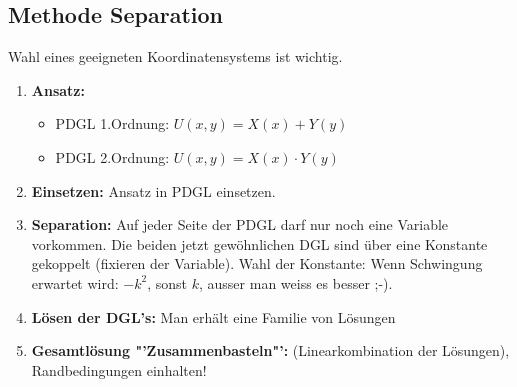 \subsection{Methode Separation}
Wahl eines geeigneten Koordinatensystems ist wichtig.


\begin{enumerate}
\item \textbf{Ansatz: }
	\begin{itemize}
		\item PDGL 1.Ordnung: $U(x,y)=X(x) + Y(y)$
		\item PDGL 2.Ordnung: $U(x,y)=X(x) \cdot Y(y)$ 
	\end{itemize}
\item \textbf{Einsetzen: } Ansatz in PDGL einsetzen.
\item \textbf{Separation: } Auf jeder Seite der PDGL darf nur noch eine Variable vorkommen. Die beiden jetzt gewöhnlichen DGL sind über eine Konstante gekoppelt (fixieren der Variable). Wahl der Konstante: Wenn Schwingung erwartet wird: $-k^2$, sonst $k$, ausser man weiss es besser ;-).
\item \textbf{Lösen der DGL's: } Man erhält eine Familie von Lösungen	
\item \textbf{Gesamtlösung "'Zusammenbasteln"': } (Linearkombination der Lösungen), Randbedingungen einhalten!
\end{enumerate}


